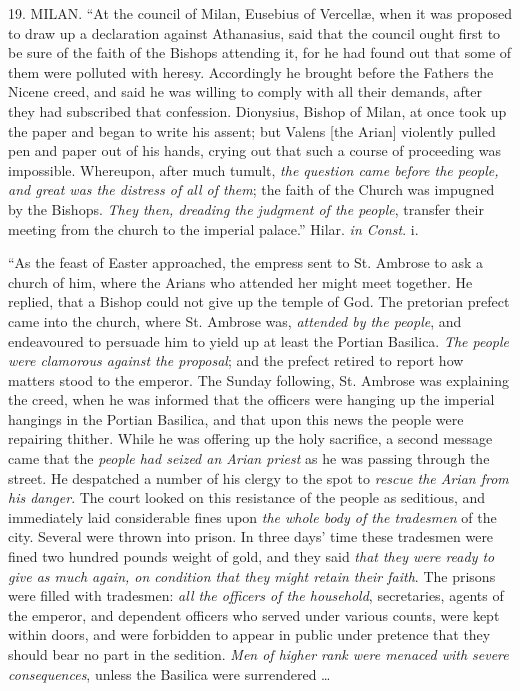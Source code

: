 19. MILAN.
``At the council of Milan, Eusebius of Vercellæ, when it was proposed to
draw up a declaration against Athanasius, said that the council ought
first to be sure of the faith of the Bishops attending it, for he had
found out that some of them were polluted with heresy. Accordingly he
brought before the Fathers the Nicene creed, and said he was willing to
comply with all their demands, after they had subscribed that
confession. Dionysius, Bishop of Milan, at once took up the paper and
began to write his assent; but Valens [the Arian] violently pulled pen
and paper out of his hands, crying out that such a course of proceeding
was impossible. Whereupon, after much tumult, \emph{the question came
before the people, and great was the distress of all of them}; the
faith of the Church was impugned by the Bishops. \emph{They then, dreading
the judgment of the people}, transfer their meeting from the church
to the imperial palace.'' Hilar. \emph{in Const}. i.

``As the feast of Easter approached, the empress
sent to St. Ambrose to ask a church of him, where the Arians who
attended her might meet together. He replied, that a Bishop could not
give up the temple of God. The pretorian prefect came into the church,
where St. Ambrose was, \emph{attended by the people}, and endeavoured to
persuade him to yield up at least the Portian Basilica. \emph{The people
were clamorous against the proposal}; and the prefect retired to
report how matters stood to the emperor. The Sunday following, St.
Ambrose was explaining the creed, when he was informed that the officers
were hanging up the imperial hangings in the Portian Basilica, and that
upon this news the people were repairing thither. While he was offering
up the holy sacrifice, a second message came that the \emph{people had
seized an Arian priest} as he was passing through the street. He
despatched a number of his clergy to the spot to \emph{rescue the Arian
from his danger}. The court looked on this resistance of the people
as seditious, and immediately laid considerable fines upon \emph{the whole
body of the tradesmen} of the city. Several were thrown into prison.
In three days' time these tradesmen were fined two hundred pounds
weight of gold, and they said \emph{that they were ready to give as much
again, on condition that they might retain their faith}. The prisons
were filled with tradesmen: \emph{all the officers of the household},
secretaries, agents of the emperor, and dependent officers who served
under various counts, were kept within doors, and were forbidden to
appear in public under pretence that they should bear no part in the
sedition. \emph{Men of higher rank were menaced with severe consequences},
unless the Basilica were surrendered …

